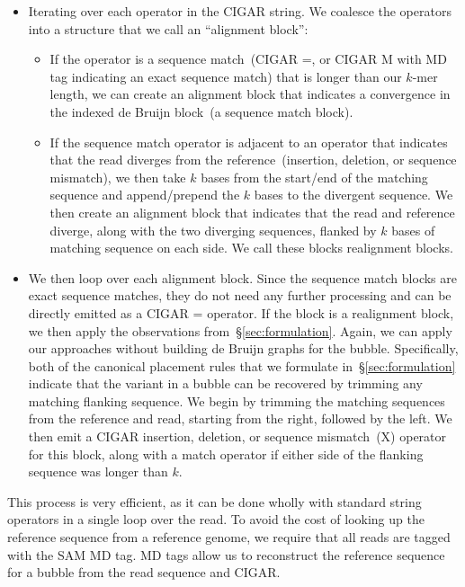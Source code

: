 \documentclass[phd]{ucbthesis}
\begin{document}
\begin{itemize}
\item Iterating over each operator in the CIGAR string. We coalesce the operators
into a structure that we call an ``alignment block'':
\begin{itemize}
\item If the operator is a sequence match~(CIGAR {=}, or CIGAR {M}
with MD tag indicating an exact sequence match) that is longer than our $k$-mer
length, we can create an alignment block that indicates a convergence in the
indexed de Bruijn block~(a sequence match block).
\item If the sequence match operator is adjacent to an operator that indicates
that the read diverges from the reference~(insertion, deletion, or sequence
mismatch), we then take $k$ bases from the start/end of the matching sequence
and append/prepend the $k$ bases to the divergent sequence. We then create an
alignment block that indicates that the read and reference diverge, along with
the two diverging sequences, flanked by $k$ bases of matching sequence on
each side. We call these blocks realignment blocks.
\end{itemize}
\item We then loop over each alignment block. Since the sequence match blocks
are exact sequence matches, they do not need any further processing and can be
directly emitted as a CIGAR {=} operator. If the block is a realignment
block, we then apply the observations from~\S\ref{sec:formulation}. Again, we
can apply our approaches without building de Bruijn graphs for the bubble.
Specifically, both of the canonical placement rules that we formulate
in~\S\ref{sec:formulation} indicate that the variant in a bubble can be recovered
by trimming any matching flanking sequence. We begin by trimming the matching
sequences from the reference and read, starting from the right, followed
by the left. We then emit a CIGAR insertion, deletion, or sequence
mismatch~({X}) operator for this block, along with a match operator if
either side of the flanking sequence was longer than $k$.
\end{itemize}

This process is very efficient, as it can be done wholly with standard string
operators in a single loop over the read. To avoid the cost of looking up the
reference sequence from a reference genome, we require that all reads are
tagged with the SAM {MD} tag. MD tags allow us to reconstruct the
reference sequence for a bubble from the read sequence and CIGAR.
\end{document}
